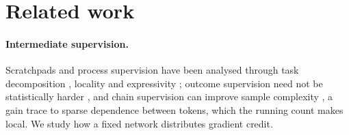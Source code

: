\section{Related work}
\label{sec:related}

\begin{table}[t]
\caption{\textbf{Positioning.} Entries summarize what each work proves, as described in the text.}
\label{tab:related}
\centering\footnotesize
{}
\end{table}

\paragraph{Intermediate supervision.} Scratchpads and process supervision
\citep{nye2021scratchpads,uesato2022solving,wei2022cot,lightman2023verify} have been analysed through task decomposition
\citep{wies2023subtask}, locality \citep{prystawski2023think,abbe2024globality} and expressivity
\citep{feng2023towards,merrill2024expressive,malach2023autoregressive}; outcome supervision need not be statistically
harder \citep{jia2025verify}, and chain supervision can improve sample complexity
\citep{hanneke2026samplecomplexityautoregressivereasoning,wen2024sparse}, a gain \citet{wen2024sparse} trace to sparse dependence between
tokens, which the running count makes local. We study how a fixed network distributes gradient credit.

